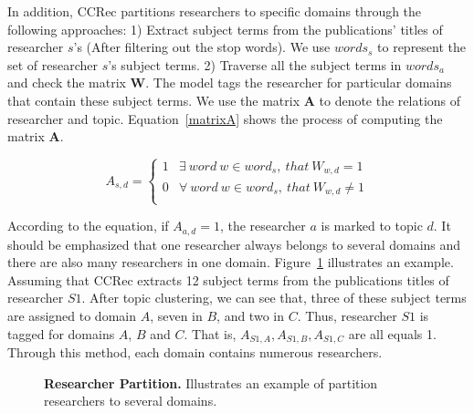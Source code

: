 \documentclass[10pt,letterpaper]{article}
\begin{document}
In addition, CCRec partitions researchers to specific domains through the following approaches: 1) Extract subject terms from the publications' titles of researcher $s$'s (After filtering out the stop words). We use $words_{s}$ to represent the set of researcher $s$'s subject terms. 2) Traverse all the subject terms in $words_{a}$ and check the matrix $\mathbf{W}$. The model tags the researcher for particular domains that contain these subject terms. We use the matrix $\mathbf{A}$ to denote the relations of researcher and topic. Equation~\ref{matrixA} shows the process of computing the matrix $\mathbf{A}$.

\begin{equation}
\label{matrixA}
A_{s,d}=\left\{\begin{array}{ll}
1 & \exists~ word~ w \in word_{s},~ that~ W_{w,d}=1\\
0 & \forall~ word~ w \in word_{s},~ that~ W_{w,d}\neq 1\\
\end{array}\right.
\end{equation}

According to the equation, if $A_{a,d}=1$, the researcher $a$ is marked to topic $d$. It should be emphasized that one researcher always belongs to several domains and there are also many researchers in one domain. Figure~\ref{Fig. 2} illustrates an example. Assuming that CCRec extracts 12 subject terms from the publications titles of researcher $S1$. After topic clustering, we can see that, three of these subject terms are assigned to domain $A$, seven in $B$, and two in $C$. Thus, researcher $S1$ is tagged for domains $A$, $B$ and $C$. That is, $A_{S1,A},A_{S1,B},A_{S1,C}$ are all equals 1. Through this method, each domain contains numerous researchers.

\begin{figure}[!hbt]
\caption{{\bf Researcher Partition.} Illustrates an example of partition researchers to several domains.}
\label{Fig. 2}
\end{figure}
\end{document}
